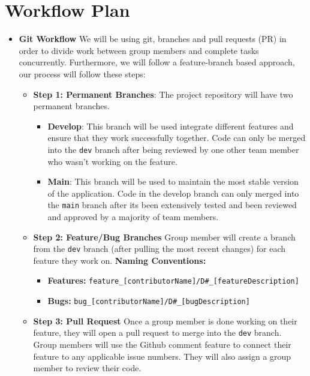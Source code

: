 \documentclass{article}
\begin{document}
\section{Workflow Plan}

\begin{itemize}
	\item\textbf{Git Workflow \newline}
	 We will be using git, branches and pull requests (PR) in order to divide work between group members and complete tasks concurrently. 
   Furthermore, we will follow a feature-branch based approach, our process will follow these steps:
   \begin{itemize}
    \item \textbf{Step 1: Permanent Branches}: The project repository will have two permanent branches. 
   \begin{itemize}
      \item \textbf{Develop}: This branch will be used integrate different features and ensure that they work successfully together. Code can only be merged into the \texttt{dev} branch after being reviewed by one other team member who wasn't working on the feature. 
      \item \textbf{Main}: This branch will be used to maintain the most stable version of the application. Code in the develop branch can only merged into the \texttt{main} branch after its been extensively tested and been reviewed and approved by a majority of team members. 
    \end{itemize}

    \item \textbf{Step 2: Feature/Bug Branches} Group member will create a branch from the \texttt{dev} branch (after pulling the most recent changes) for each feature they work on. \newline
    \textbf{Naming Conventions:}
    \begin{itemize}
      \item \textbf{Features: }\texttt{feature\_[contributorName]/D\#\_[featureDescription]} 
      \item \textbf{Bugs: }  \texttt{bug\_[contributorName]/D\#\_[bugDescription]}
    \end{itemize}

  \item \textbf{Step 3: Pull Request} Once a group member is done working on their feature, they will open a pull request to merge into the \texttt{dev} branch. Group members will use the Github comment feature to connect their feature to any applicable issue numbers. They will also assign a group member to review their code.
    \end{itemize}


\end{itemize}
\end{document}
